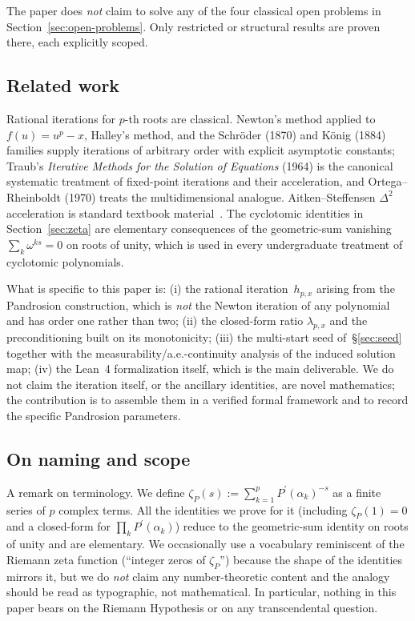 \documentclass[11pt,a4paper]{article}
\theoremstyle{definition}
\theoremstyle{remark}
\begin{document}
The paper does \emph{not} claim to solve any of the four classical open
problems in Section~\ref{sec:open-problems}. Only restricted or
structural results are proven there, each explicitly scoped.

\subsection{Related work}
\label{sec:related-work}

Rational iterations for $p$-th roots are classical. Newton's method applied
to $f(u) = u^p - x$, Halley's method, and the Schröder (1870) and
König (1884) families supply iterations of arbitrary order with explicit
asymptotic constants; Traub's \emph{Iterative Methods for the Solution
of Equations} (1964) is the canonical systematic treatment of fixed-point
iterations and their acceleration, and Ortega--Rheinboldt (1970) treats
the multidimensional analogue. Aitken--Steffensen $\Delta^2$ acceleration
is standard textbook material~\cite{numrecipes}. The cyclotomic identities
in Section~\ref{sec:zeta} are elementary consequences of the geometric-sum
vanishing $\sum_k \omega^{ks} = 0$ on roots of unity, which is used in
every undergraduate treatment of cyclotomic polynomials.

What is specific to this paper is: (i) the rational iteration~$h_{p,x}$
arising from the Pandrosion construction, which is \emph{not} the Newton
iteration of any polynomial and has order one rather than two; (ii) the
closed-form ratio $\lambda_{p,x}$ and the preconditioning built on its
monotonicity; (iii) the multi-start seed of~\S\ref{sec:seed} together
with the measurability/a.e.-continuity analysis of the induced solution
map; (iv) the Lean~4 formalization itself, which is the main deliverable.
We do not claim the iteration itself, or the ancillary identities, are
novel mathematics; the contribution is to assemble them in a verified
formal framework and to record the specific Pandrosion parameters.

\subsection{On naming and scope}

A remark on terminology. We define
$\zeta_P(s) := \sum_{k=1}^p P^{\prime}(\alpha_k)^{-s}$ as a finite series
of $p$ complex terms. All the identities we prove for it
(including $\zeta_P(1) = 0$ and a closed-form for
$\prod_k P^{\prime}(\alpha_k)$) reduce to the geometric-sum identity on
roots of unity and are elementary. We occasionally use a vocabulary
reminiscent of the Riemann zeta function (``integer zeros of $\zeta_P$'')
because the shape of the identities mirrors it, but we do \emph{not}
claim any number-theoretic content and the analogy should be read as
typographic, not mathematical. In particular, nothing in this paper
bears on the Riemann Hypothesis or on any transcendental question.
\end{document}

